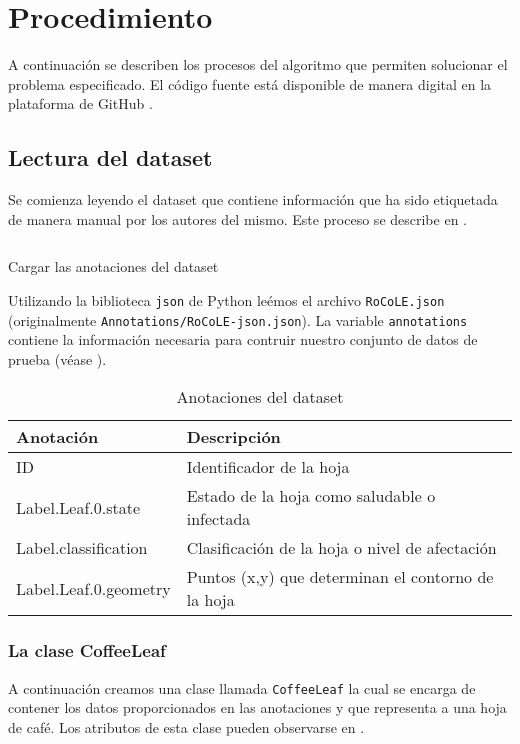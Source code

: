 \chapter{Procedimiento}
A continuación se describen los procesos del algoritmo que permiten solucionar el problema especificado. El código fuente está disponible de manera digital en la plataforma de GitHub \cite{LindermanDgz}.

\section{Lectura del dataset}
Se comienza leyendo el dataset que contiene información que ha sido etiquetada de manera manual por los autores del mismo. Este proceso se describe en .

\begin{listing}[!ht]
\inputminted{python}{code_listings/load_dataset.py}
\caption{Cargar las anotaciones del dataset}
\label{code:load_dataset}
\end{listing}

Utilizando la biblioteca \texttt{json} de Python leémos el archivo \texttt{RoCoLE.json} (originalmente \texttt{Annotations/RoCoLE-json.json}). La variable \texttt{annotations} contiene la información necesaria para contruir nuestro conjunto de datos de prueba (véase ).

\begin{table}[h!]
\centering
\begin{tabular}{|l|l|}
\hline 
\textbf{Anotación} & \textbf{Descripción} \\ 
\hline 
ID & Identificador de la hoja \\ 
\hline 
Label.Leaf.0.state & Estado de la hoja como saludable o infectada \\ 
\hline 
Label.classification & Clasificación de la hoja o nivel de afectación \\ 
\hline 
Label.Leaf.0.geometry & Puntos (x,y) que determinan el contorno de la hoja \\ 
\hline 
\end{tabular}
\caption{Anotaciones del dataset}
\label{table:required_annotations}
\end{table}

\subsection{La clase CoffeeLeaf}
A continuación creamos una clase llamada \texttt{CoffeeLeaf} la cual se encarga de contener los datos proporcionados en las anotaciones y que representa a una hoja de café. Los atributos de esta clase pueden observarse en .

